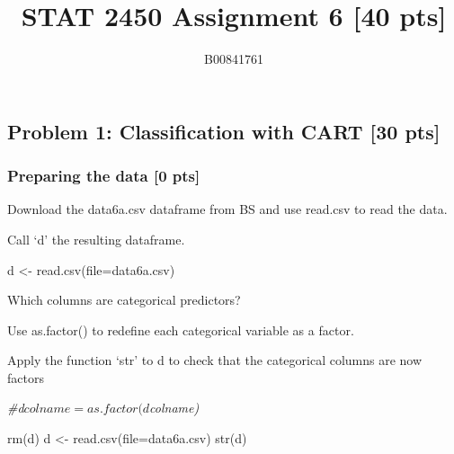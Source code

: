 \documentclass[
]{article}
\title{STAT 2450 Assignment 6 {[}40 pts{]}}
\author{B00841761}
\date{}
\newenvironment{Shaded}{\begin{snugshade}}{\end{snugshade}}
\newcommand{\AttributeTok}[1]{\textcolor[rgb]{0.77,0.63,0.00}{#1}}
\newcommand{\CommentTok}[1]{\textcolor[rgb]{0.56,0.35,0.01}{\textit{#1}}}
\newcommand{\FunctionTok}[1]{\textcolor[rgb]{0.00,0.00,0.00}{#1}}
\newcommand{\NormalTok}[1]{#1}
\newcommand{\OtherTok}[1]{\textcolor[rgb]{0.56,0.35,0.01}{#1}}
\newcommand{\StringTok}[1]{\textcolor[rgb]{0.31,0.60,0.02}{#1}}
\begin{document}
\maketitle

\hypertarget{problem-1-classification-with-cart-30-pts}{%
\subsection{Problem 1: Classification with CART {[}30
pts{]}}\label{problem-1-classification-with-cart-30-pts}}

\hypertarget{preparing-the-data-0-pts}{%
\subsubsection{Preparing the data {[}0
pts{]}}\label{preparing-the-data-0-pts}}

Download the data6a.csv dataframe from BS and use read.csv to read the
data.

Call `d' the resulting dataframe.

\begin{Shaded}
\begin{Highlighting}[]
\NormalTok{d }\OtherTok{\textless{}{-}} \FunctionTok{read.csv}\NormalTok{(}\AttributeTok{file=}\StringTok{\textquotesingle{}data6a.csv\textquotesingle{}}\NormalTok{)}
\end{Highlighting}
\end{Shaded}

Which columns are categorical predictors?

Use as.factor() to redefine each categorical variable as a factor.

Apply the function `str' to d to check that the categorical columns are
now factors

\begin{Shaded}
\begin{Highlighting}[]
\CommentTok{\#d$colname = as.factor(d$colname)}
\end{Highlighting}
\end{Shaded}

\begin{Shaded}
\begin{Highlighting}[]
\FunctionTok{rm}\NormalTok{(d)}
\NormalTok{d }\OtherTok{\textless{}{-}} \FunctionTok{read.csv}\NormalTok{(}\AttributeTok{file=}\StringTok{\textquotesingle{}data6a.csv\textquotesingle{}}\NormalTok{)}
\FunctionTok{str}\NormalTok{(d)}
\end{Highlighting}
\end{Shaded}
\end{document}
